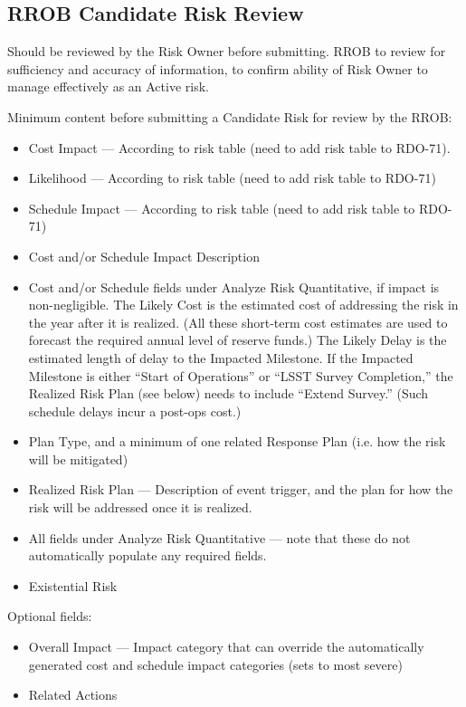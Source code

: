 \subsection{RROB Candidate Risk Review}

Should be reviewed by the Risk Owner before submitting.
RROB to review for sufficiency and accuracy of information, to confirm ability of Risk Owner to manage effectively as an Active risk.

Minimum content before submitting a Candidate Risk for review by the RROB:
\begin{itemize}
	\item Cost Impact --- According to risk table (need to add risk table to RDO-71).
	\item Likelihood --- According to risk table (need to add risk table to RDO-71)
	\item Schedule Impact --- According to risk table (need to add risk table to RDO-71)
	\item Cost and/or Schedule Impact Description
	\item Cost and/or Schedule fields under Analyze Risk Quantitative, if impact is non-negligible.
	The Likely Cost is the estimated cost of addressing the risk in the year after it is realized.
	(All these short-term cost estimates are used to forecast the required annual level of reserve funds.)
	The Likely Delay is the estimated length of delay to the Impacted Milestone.
	If the Impacted Milestone is either ``Start of Operations'' or ``LSST Survey Completion,'' the Realized Risk Plan (see below) needs to include ``Extend Survey.''
	(Such schedule delays incur a post-ops cost.)
	\item Plan Type, and a minimum of one related Response Plan (i.e. how the risk will be mitigated)
	\item Realized Risk Plan --- Description of event trigger, and the plan for how the risk will be addressed once it is realized.
	\item All fields under Analyze Risk Quantitative --- note that these do not automatically populate any required fields.
	\item Existential Risk
\end{itemize}

Optional fields:
\begin{itemize}
	\item Overall Impact --- Impact category that can override the automatically generated cost and schedule impact categories (sets to most severe)
	\item Related Actions
\end{itemize}

